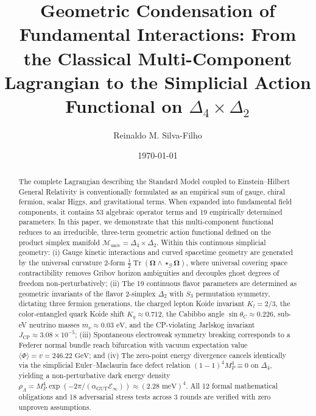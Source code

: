 \documentclass[11pt,reqno]{amsart}
\title[Geometric Condensation of Fundamental Interactions]{Geometric Condensation of Fundamental Interactions: From the Classical Multi-Component Lagrangian to the Simplicial Action Functional on $\Delta_4 \times \Delta_2$}
\author{Reinaldo M. Silva-Filho}
\date{\today}
\author@andify\authors
\theoremstyle{definition}
\newcommand{\GUT}{\mathrm{GUT}}
\begin{document}
\begin{abstract}
The complete Lagrangian describing the Standard Model coupled to Einstein--Hilbert General Relativity is conventionally formulated as an empirical sum of gauge, chiral fermion, scalar Higgs, and gravitational terms. When expanded into fundamental field components, it contains 53 algebraic operator terms and 19 empirically determined parameters. In this paper, we demonstrate that this multi-component functional reduces to an irreducible, three-term geometric action functional defined on the product simplex manifold $\mathcal{M}_{\mathrm{univ}} = \Delta_4 \times \Delta_2$.
Within this continuous simplicial geometry: (i) Gauge kinetic interactions and curved spacetime geometry are generated by the universal curvature 2-form $\frac{1}{2}\operatorname{Tr}(\boldsymbol{\Omega} \wedge \star_{\mathcal{G}} \boldsymbol{\Omega})$, where universal covering space contractibility removes Gribov horizon ambiguities and decouples ghost degrees of freedom non-perturbatively; (ii) The 19 continuous flavor parameters are determined as geometric invariants of the flavor 2-simplex $\Delta_2$ with $S_3$ permutation symmetry, dictating three fermion generations, the charged lepton Koide invariant $K_l = 2/3$, the color-entangled quark Koide shift $K_q \approx 0.712$, the Cabibbo angle $\sin \theta_C \approx 0.226$, sub-eV neutrino masses $m_\nu \approx 0.03\text{ eV}$, and the CP-violating Jarlskog invariant $J_{\mathrm{CP}} \approx 3.08 \times 10^{-5}$; (iii) Spontaneous electroweak symmetry breaking corresponds to a Federer normal bundle reach bifurcation with vacuum expectation value $\langle \Phi \rangle = v = 246.22\text{ GeV}$; and (iv) The zero-point energy divergence cancels identically via the simplicial Euler--Maclaurin face defect relation $(1-1)^4 M_P^4 \equiv 0$ on $\Delta_4$, yielding a non-perturbative dark energy density $\rho_\Lambda = M_P^4 \exp(-2\pi / (\alpha_{\GUT}\mathcal{E}_\infty)) \approx (2.28\text{ meV})^4$. All 12 formal mathematical obligations and 18 adversarial stress tests across 3 rounds are verified with zero unproven assumptions.
\end{abstract}

\maketitle

\tableofcontents

\newpage

\end{document}
